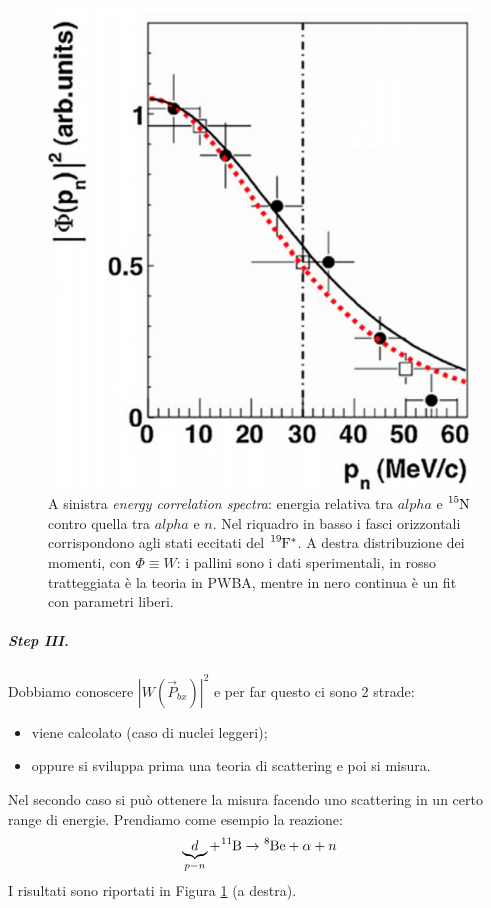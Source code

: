 \begin{figure}[h]
	\includegraphics[scale=0.5]{Immagini/0421_pn.png}
	\caption{A sinistra \textit{energy correlation spectra}: energia relativa tra $alpha$ e $\ce{^{15}N}$ contro quella tra $alpha$ e $n$. Nel riquadro in basso i fasci orizzontali corrispondono agli stati eccitati del $\ce{^{19}F}^*$.	A destra distribuzione dei momenti, con $\Phi\equiv W$: i pallini sono i dati sperimentali, in rosso tratteggiata è la teoria in PWBA, mentre in nero continua è un fit con parametri liberi.}
	\label{0421_spec-W}
\end{figure}
\subparagraph{Step III.} 
Dobbiamo conoscere $|W(\vec{P}_{bx})|^2$ e per far questo ci sono 2 strade:
\begin{itemize}
	\item viene calcolato (caso di nuclei leggeri);
	\item oppure si sviluppa prima una teoria di scattering e poi si misura.
\end{itemize}
Nel secondo caso si può ottenere la misura facendo uno scattering in un certo range di energie. Prendiamo come esempio la reazione:
$$ \underbrace{d}_{p-n} + \ce{^{11}B} \to \ce{^{8}Be} +\alpha +n $$ 
I risultati sono riportati in Figura \ref{0421_spec-W} (a destra).
